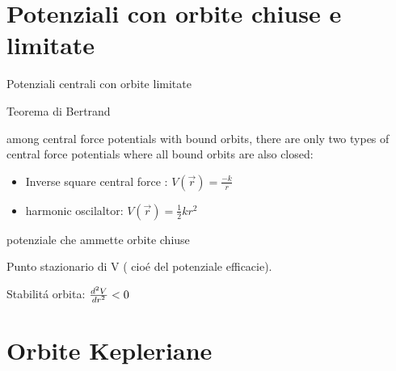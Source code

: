 \section{Potenziali con orbite chiuse e limitate}

\begin{frame}{Potenziali centrali con orbite limitate}

\begin{block}{Teorema di Bertrand}

among central force potentials with bound orbits, there are only two types of central force potentials where all bound orbits are also closed:

\begin{itemize}

\item Inverse square central force : $V(\vec{r})=\frac{-k}{r}$

\item harmonic oscilaltor: $V(\vec{r})=\frac{1}{2}kr^2$

\end{itemize}

\end{block}

\end{frame}

\begin{wordonframe}{potenziale che ammette orbite chiuse}

Punto stazionario di V ( cio\'e del potenziale efficacie).

Stabilit\'a orbita: $\TtwoDy{r}{V}<0$

\end{wordonframe}

\section{Orbite Kepleriane}

